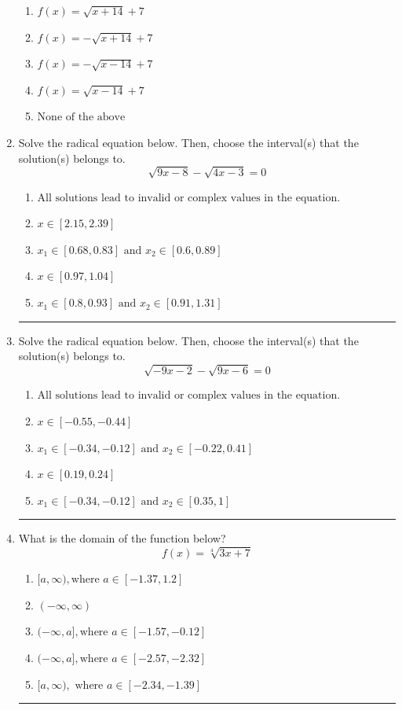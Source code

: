 \documentclass[14pt]{extbook}
\newcommand{\litem}[1]{\item#1\hspace*{-1cm}\rule{\textwidth}{0.4pt}}
\begin{document}
\begin{enumerate}
{\begin{center}
\end{center}
\begin{enumerate}[label=\Alph*.]
\item \( f(x) = \sqrt{x + 14} + 7 \)
\item \( f(x) = - \sqrt{x + 14} + 7 \)
\item \( f(x) = - \sqrt{x - 14} + 7 \)
\item \( f(x) = \sqrt{x - 14} + 7 \)
\item \( \text{None of the above} \)

\end{enumerate} }
\litem{
Solve the radical equation below. Then, choose the interval(s) that the solution(s) belongs to.\[ \sqrt{9 x - 8} - \sqrt{4 x - 3} = 0 \]\begin{enumerate}[label=\Alph*.]
\item \( \text{All solutions lead to invalid or complex values in the equation.} \)
\item \( x \in [2.15,2.39] \)
\item \( x_1 \in [0.68, 0.83] \text{ and } x_2 \in [0.6,0.89] \)
\item \( x \in [0.97,1.04] \)
\item \( x_1 \in [0.8, 0.93] \text{ and } x_2 \in [0.91,1.31] \)

\end{enumerate} }
\litem{
Solve the radical equation below. Then, choose the interval(s) that the solution(s) belongs to.\[ \sqrt{-9 x - 2} - \sqrt{9 x - 6} = 0 \]\begin{enumerate}[label=\Alph*.]
\item \( \text{All solutions lead to invalid or complex values in the equation.} \)
\item \( x \in [-0.55,-0.44] \)
\item \( x_1 \in [-0.34, -0.12] \text{ and } x_2 \in [-0.22,0.41] \)
\item \( x \in [0.19,0.24] \)
\item \( x_1 \in [-0.34, -0.12] \text{ and } x_2 \in [0.35,1] \)

\end{enumerate} }
\litem{
What is the domain of the function below?\[ f(x) = \sqrt[4]{3 x + 7} \]\begin{enumerate}[label=\Alph*.]
\item \( [a, \infty), \text{where } a \in [-1.37, 1.2] \)
\item \( (-\infty, \infty) \)
\item \( (-\infty, a], \text{where } a \in [-1.57, -0.12] \)
\item \( (-\infty, a], \text{where } a \in [-2.57, -2.32] \)
\item \( [a, \infty), \text{ where } a \in [-2.34, -1.39] \)


\end{enumerate}}
\end{enumerate}
\end{document}

